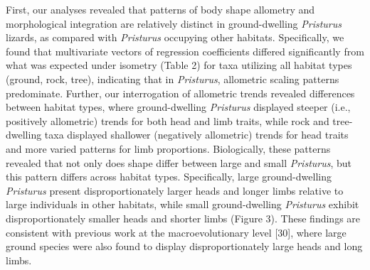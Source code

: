 \documentclass[
  11pt,
]{article}
\begin{document}
First, our analyses revealed that patterns of body shape allometry and
morphological integration are relatively distinct in ground-dwelling
\emph{Pristurus} lizards, as compared with \emph{Pristurus} occupying
other habitats. Specifically, we found that multivariate vectors of
regression coefficients differed significantly from what was expected
under isometry (Table 2) for taxa utilizing all habitat types (ground,
rock, tree), indicating that in \emph{Pristurus}, allometric scaling
patterns predominate. Further, our interrogation of allometric trends
revealed differences between habitat types, where ground-dwelling
\emph{Pristurus} displayed steeper (i.e., positively allometric) trends
for both head and limb traits, while rock and tree-dwelling taxa
displayed shallower (negatively allometric) trends for head traits and
more varied patterns for limb proportions. Biologically, these patterns
revealed that not only does shape differ between large and small
\emph{Pristurus}, but this pattern differs across habitat types.
Specifically, large ground-dwelling \emph{Pristurus} present
disproportionately larger heads and longer limbs relative to large
individuals in other habitats, while small ground-dwelling
\emph{Pristurus} exhibit disproportionately smaller heads and shorter
limbs (Figure 3). These findings are consistent with previous work at
the macroevolutionary level {[}30{]}, where large ground species were
also found to display disproportionately large heads and long limbs.
\hfill\break
\end{document}
